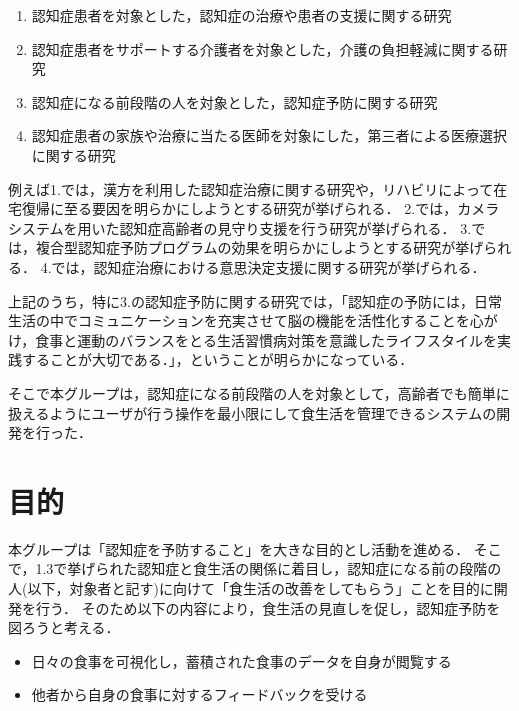 \documentclass[../report]{subfiles}
\begin{document}
\begin{enumerate}
    \item 認知症患者を対象とした，認知症の治療や患者の支援に関する研究
    \item 認知症患者をサポートする介護者を対象とした，介護の負担軽減に関する研究
    \item 認知症になる前段階の人を対象とした，認知症予防に関する研究
    \item 認知症患者の家族や治療に当たる医師を対象にした，第三者による医療選択に関する研究
\end{enumerate}

例えば1.では，漢方を利用した認知症治療に関する研究\cite{dementia-prevention-with-chinese-medicine}や，リハビリによって在宅復帰に至る要因を明らかにしようとする研究\cite{rehabilitation}が挙げられる．
2.では，カメラシステムを用いた認知症高齢者の見守り支援を行う研究\cite{camera-system}が挙げられる．
3.では，複合型認知症予防プログラムの効果を明らかにしようとする研究\cite{dementia-prevention-with-some-programs}が挙げられる．
4.では，認知症治療における意思決定支援に関する研究\cite{medical-choice}が挙げられる．

上記のうち，特に3.の認知症予防に関する研究では，「認知症の予防には，日常生活の中でコミュニケーションを充実させて脳の機能を活性化することを心がけ，食事と運動のバランスをとる生活習慣病対策を意識したライフスタイルを実践することが大切である．」\cite{dementia-prevention}，ということが明らかになっている．

そこで本グループは，認知症になる前段階の人を対象として，高齢者でも簡単に扱えるようにユーザが行う操作を最小限にして食生活を管理できるシステムの開発を行った．


\section{目的} \label{sec:objective}
本グループは「認知症を予防すること」を大きな目的とし活動を進める．
そこで，1.3で挙げられた認知症と食生活の関係に着目し，認知症になる前の段階の人(以下，対象者と記す)に向けて「食生活の改善をしてもらう」ことを目的に開発を行う．
そのため以下の内容により，食生活の見直しを促し，認知症予防を図ろうと考える．

\begin{itemize}
    \item 日々の食事を可視化し，蓄積された食事のデータを自身が閲覧する
    \item 他者から自身の食事に対するフィードバックを受ける
\end{itemize}
\end{document}
